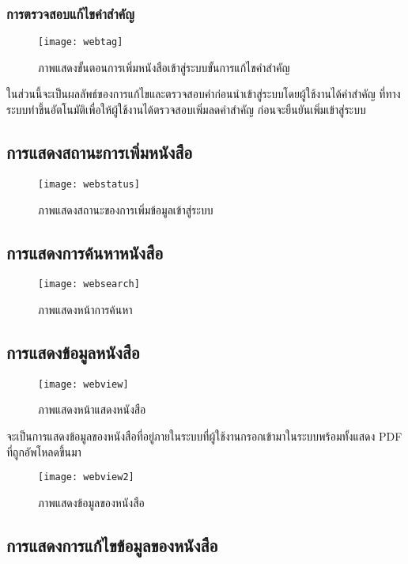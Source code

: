 \subsubsection{การตรวจสอบแก้ไขคำสำคัญ}
\begin{figure}[H]
    \centering
    \texttt{[image: webtag]}
    \caption{ภาพแสดงขั้นตอนการเพิ่มหนังสือเข้าสู่ระบบขั้นการแก้ไขคำสำคัญ}\label{fig:webtag}
\end{figure}
ในส่วนนี้จะเป็นผลลัพธ์ของการแก้ไขและตรวจสอบคำก่อนนำเข้าสู่ระบบโดยผู้ใช้งานได้คำสำคัญ ที่ทางระบบทำขึ้นอัตโนมัติเพื่อให้ผู้ใช้งานได้ตรวจสอบเพิ่มลดคำสำคัญ ก่อนจะยืนยันเพิ่มเข้าสู่ระบบ
\subsection{การแสดงสถานะการเพิ่มหนังสือ}
\begin{figure}[H]
    \centering
    \texttt{[image: webstatus]}
    \caption{ภาพแสดงสถานะของการเพิ่มข้อมูลเข้าสู่ระบบ}\label{fig:webstatus}
\end{figure}

\subsection{การแสดงการค้นหาหนังสือ}
\begin{figure}[H]
    \centering
    \texttt{[image: websearch]}
    \caption{ภาพแสดงหน้าการค้นหา}\label{fig:websearch}
\end{figure}

\subsection{การแสดงข้อมูลหนังสือ}
\begin{figure}[H]
    \centering
    \texttt{[image: webview]}
    \caption{ภาพแสดงหน้าแสดงหนังสือ}\label{fig:webview}
\end{figure}
จะเป็นการแสดงข้อมูลของหนังสือที่อยู่ภายในระบบที่ผู้ใช้งานกรอกเข้ามาในระบบพร้อมทั้งแสดง PDF ที่ถูกอัพโหลดขึ้นมา

\begin{figure}[H]
    \centering
    \texttt{[image: webview2]}
    \caption{ภาพแสดงข้อมูลของหนังสือ}\label{fig:webview2}
\end{figure}

\subsection{การแสดงการแก้ไขข้อมูลของหนังสือ}

